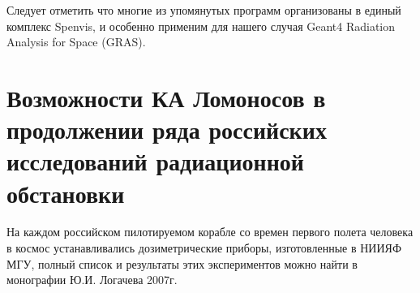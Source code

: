 Следует отметить что многие из упомянутых программ организованы в единый комплекс Spenvis,
 и особенно применим для нашего случая  Geant4 Radiation Analysis for Space (GRAS).

\section{Возможности КА Ломоносов в продолжении ряда российских исследований радиационной обстановки}

На каждом российском пилотируемом корабле со времен первого полета человека в космос устанавливались дозиметрические приборы, изготовленные в НИИЯФ МГУ, полный список и результаты этих экспериментов можно найти в монографии Ю.И. Логачева 2007г.



